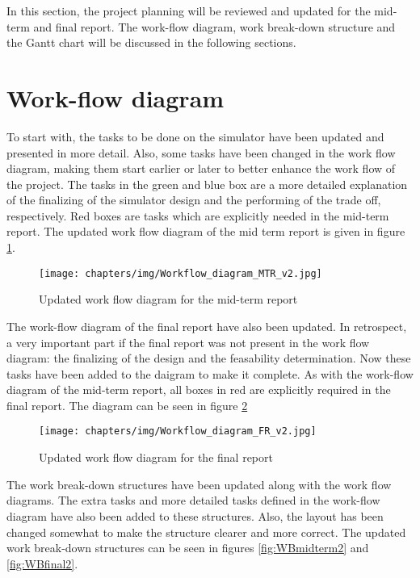 In this section, the project planning will be reviewed and updated for the mid-term and final report.
The work-flow diagram, work break-down structure and the Gantt chart will be discussed in the following sections.


\section{Work-flow diagram}
To start with, the tasks to be done on the simulator have been updated and presented in more detail. Also, some tasks have been 
changed in the work flow diagram, making them start earlier or later to better enhance the work flow of the project. 
The tasks in the green and blue box are a more detailed explanation of the finalizing of the simulator design and the performing
of the trade off, respectively. Red boxes are tasks which are explicitly needed in the mid-term report. The updated work flow diagram of the mid term report is given in figure \ref{fig:WFmidterm2}.

\begin{figure}
\texttt{[image: chapters/img/Workflow\_diagram\_MTR\_v2.jpg]}
\caption{Updated work flow diagram for the mid-term report}
\label{fig:WFmidterm2}
\end{figure}

The work-flow diagram of the final report have also been updated. In retrospect, a very important part if the final report was not 
present in the work flow diagram: the finalizing of the design and the feasability determination. Now these tasks have been added
to the daigram to make it complete. As with the work-flow diagram of the mid-term report, all boxes in red are explicitly required
in the final report. The diagram can be seen in figure \ref{fig:WFfinal2}

\begin{figure}
\texttt{[image: chapters/img/Workflow\_diagram\_FR\_v2.jpg]}
\caption{Updated work flow diagram for the final report}
\label{fig:WFfinal2}
\end{figure}


The work break-down structures have been updated along with the work flow diagrams. The extra tasks and more detailed tasks
defined in the work-flow diagram have also been added to these structures. Also, the layout has been changed somewhat to make the structure clearer and more correct. The updated work break-down structures can be seen in figures \ref{fig:WBmidterm2} and \ref{fig:WBfinal2}.

